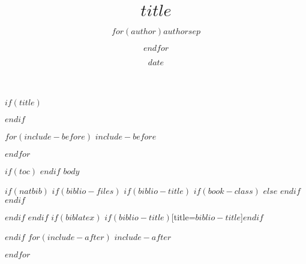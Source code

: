\documentclass[$if(fontsize)$$fontsize$,$endif$$if(lang)$$lang$,$endif$]{$documentclass$}
\title{$title$}
\author{$for(author)$$author$$sep$ \and $endfor$}
\date{$date$}
\begin{document}
$if(title)$
\maketitle
$endif$

$for(include-before)$
$include-before$

$endfor$

\newpage

$if(toc)$
{
\hypersetup{linkcolor=black}
\setcounter{tocdepth}{$toc-depth$}
\tableofcontents
}
$endif$
$body$

$if(natbib)$
$if(biblio-files)$
$if(biblio-title)$
$if(book-class)$
\renewcommand\bibname{$biblio-title$}
$else$
\renewcommand\refname{$biblio-title$}
$endif$
$endif$


$endif$
$endif$
$if(biblatex)$
\printbibliography$if(biblio-title)$[title=$biblio-title$]$endif$

$endif$
$for(include-after)$
$include-after$

$endfor$


\end{document}
